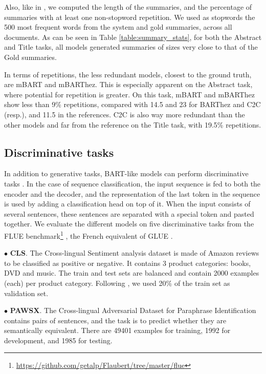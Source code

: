 \documentclass[11pt,a4paper]{article}
\begin{document}
Also, like in \citet{rothe2020leveraging}, we computed the length of the summaries, and the percentage of summaries with at least one non-stopword repetition. We used as stopwords the 500 most frequent words from the system and gold summaries, across all documents.
As can be seen in Table \ref{table:summary_stats}, for both the Abstract and Title tasks, all models generated summaries of sizes very close to that of the Gold summaries.

In terms of repetitions, the less redundant models, closest to the ground truth, are mBART and mBARThez.
This is especially apparent on the Abstract task, where potential for repetition is greater.
On this task, mBART and mBARThez show less than 9\% repetitions, compared with 14.5 and 23 for BARThez and C2C (resp.), and 11.5 in the references.
C2C is also way more redundant than the other models and far from the reference on the Title task, with 19.5\% repetitions.

\subsection{Discriminative tasks}
In addition to generative tasks, BART-like models can perform discriminative tasks \cite{lewis2019bart}.
In the case of sequence classification, the input sequence is fed to both the encoder and the decoder, and the representation of the last token in the sequence is used by adding a classification head on top of it.
When the input consists of several sentences, these sentences are separated with a special token and pasted together.
We evaluate the different models on five discriminative tasks from the FLUE benchmark\footnote{\tiny\url{https://github.com/getalp/Flaubert/tree/master/flue}} \cite{le2019flaubert}, the French equivalent of GLUE \cite{wang2018glue}.

\noindent $\bullet$ \textbf{CLS}. The Cross-lingual Sentiment analysis dataset \cite{prettenhofer2010cross} is made of Amazon reviews to be classified as positive or negative.
It contains 3 product categories: books, DVD and music.
The train and test sets are balanced and contain 2000 examples (each) per product category.
Following  \citet{le2019flaubert}, we used 20\% of the train set as validation set.

\noindent $\bullet$ \textbf{PAWSX}. The Cross-lingual Adversarial Dataset for Paraphrase Identification \cite{yang2019paws} contains pairs of sentences, and the task is to predict whether they are semantically equivalent.
There are 49401 examples for training, 1992 for development, and 1985 for testing.
\end{document}
